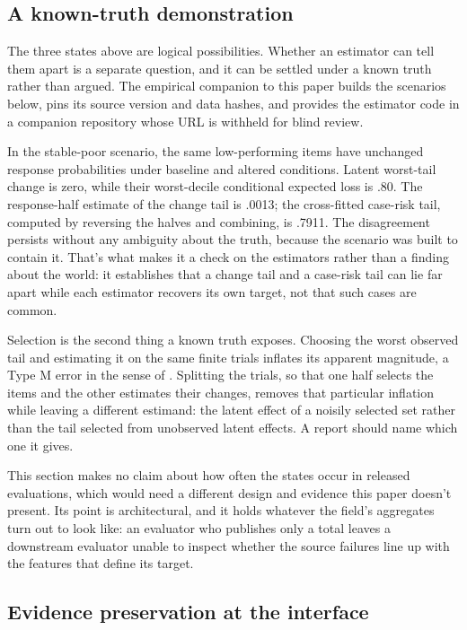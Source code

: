 \documentclass[12pt]{article}
\begin{document}
\subsection{A known-truth demonstration}\label{ssec:released}

The three states above are logical possibilities. Whether an estimator can tell them apart is a separate question, and it can be settled under a known truth rather than argued. The empirical companion to this paper builds the scenarios below, pins its source version and data hashes, and provides the estimator code  in a companion repository whose URL is withheld for blind review.

In the stable-poor scenario, the same low-performing items have unchanged response probabilities under baseline and altered conditions. Latent worst-tail change is zero, while their worst-decile conditional expected loss is .80. The response-half estimate of the change tail is .0013; the cross-fitted case-risk tail, computed by reversing the halves and combining, is .7911. The disagreement persists without any ambiguity about the truth, because the scenario was built to contain it. That's what makes it a check on the estimators rather than a finding about the world: it establishes that a change tail and a case-risk tail can lie far apart while each estimator recovers its own target, not that such cases are common.

Selection is the second thing a known truth exposes. Choosing the worst observed tail and estimating it on the same finite trials inflates its apparent magnitude, a Type M error in the sense of \textcite{gelman2014types}. Splitting the trials, so that one half selects the items and the other estimates their changes, removes that particular inflation while leaving a different estimand: the latent effect of a noisily selected set rather than the tail selected from unobserved latent effects. A report should name which one it gives.

This section makes no claim about how often the states occur in released evaluations, which would need a different design and evidence this paper doesn't present. Its point is architectural, and it holds whatever the field's aggregates turn out to look like: an evaluator who publishes only a total leaves a downstream evaluator unable to inspect whether the source failures line up with the features that define its target.

\subsection{Evidence preservation at the interface}\label{ssec:preservation}
\end{document}
